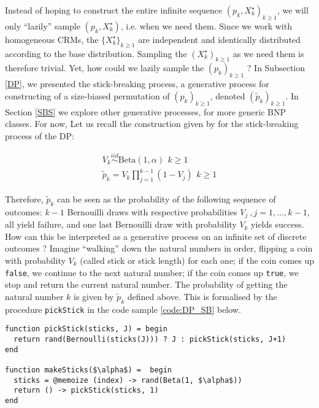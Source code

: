 Instead of hoping to construct the entire infinite sequence $\left({p}_k, X^\star_k \right)_{k \ge 1}$, we will only ``lazily'' sample $\left({p}_k, X^\star_k \right)$, i.e. when we need them.
Since we work with homogeneous \glspl{CRM}, the $\{X^\star_k\}_{k \ge 1}$ are independent and identically distributed according to the base distribution. Sampling the $(X^\star_k)_{k \ge 1}$ as we need them is therefore trivial. Yet, how could we lazily sample the $({p}_k)_{k \ge 1}$ ?
In Subsection \ref{DP}, we presented the stick-breaking process, a generative process for constructing of a size-biased permutation of $({p}_k)_{k \ge 1}$, denoted $(\tilde{p}_k)_{k \ge 1}$.
In Section \ref{SBS} we explore other generative processes, for more generic \gls{BNP} classes. For now, Let us recall the construction given by \cite{sethuraman94} for the stick-breaking process of the \gls{DP}:


\begin{gather*}
V_k \stackrel{iid}{\sim} \text{Beta}(1, \alpha) \, \ k \ge 1 \\
\tilde{p}_k = V_k \prod_{j=1}^{k-1}(1-V_j)  \, \ k \ge 1
\end{gather*}

Therefore, $\tilde{p}_k$ can be seen as the probability of the following sequence of outcomes: $k-1$ Bernouilli draws with respective probabilities $V_j \ , j=1,\dots,k-1$, all yield failure, and one last Bernouilli draw with probability $V_k$ yields success.
How can this be interpreted as a generative process on an infinite set of discrete outcomes ?
Imagine ``walking'' down the natural numbers in order, flipping a coin with probability $V_k$ (called stick or stick length) for each one; if the coin comes up \texttt{false}, we continue to the next natural number; if the coin comes up \texttt{true}, we stop and return the current natural number. The probability of getting the natural number $k$ is given by $\tilde{p}_k$ defined above. This is formalised by the procedure \texttt{pickStick} in the code sample \ref{code:DP_SB} below.

\begin{lstlisting}[caption={\acrlong{DP} stick-breaking representation written in Julia.},captionpos=b,label=code:DP_SB]
function pickStick(sticks, J) = begin
  return rand(Bernoulli(sticks(J))) ? J : pickStick(sticks, J+1)
end

function makeSticks($\alpha$) =  begin
  sticks = @memoize (index) -> rand(Beta(1, $\alpha$))
  return () -> pickStick(sticks, 1)
end
\end{lstlisting}

